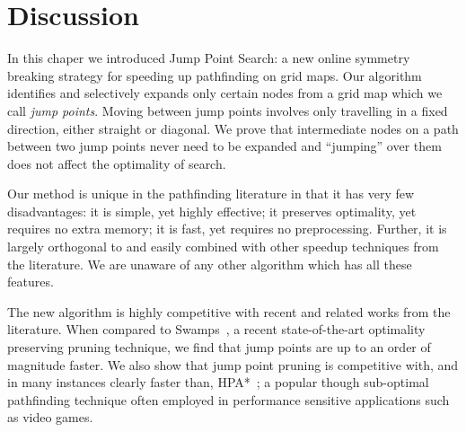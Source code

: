\section{Discussion}
\label{cha::jps::discussion}
In this chaper we introduced Jump Point Search: a new online symmetry breaking
strategy for speeding up pathfinding on grid maps.  Our algorithm identifies
and selectively expands only certain nodes from a grid map which we call
\emph{jump points}.  Moving between jump points involves only travelling in a
fixed direction, either straight or diagonal.  We prove that intermediate nodes
on a path between two jump points never need to be expanded and ``jumping'' over
them does not affect the optimality of search. 
\par
Our method is unique in the pathfinding literature in that it has very few
disadvantages: it is simple, yet highly effective; it preserves optimality, yet
requires no extra memory;  it is fast, yet requires no preprocessing.
Further, it is largely orthogonal to and easily combined with 
other speedup techniques from the literature.
We are unaware of any other algorithm which has all these features.
\par
The new algorithm is highly competitive with recent and related works from the
literature.  When compared to Swamps~\citep{pochter10}, a recent
state-of-the-art optimality preserving pruning technique, we find that jump
points are up to an order of magnitude faster.  We also show that jump point
pruning is competitive with, and in many instances clearly faster than,
HPA*~\citep{botea04}; a popular though sub-optimal pathfinding technique often
employed in performance sensitive applications such as video games.
